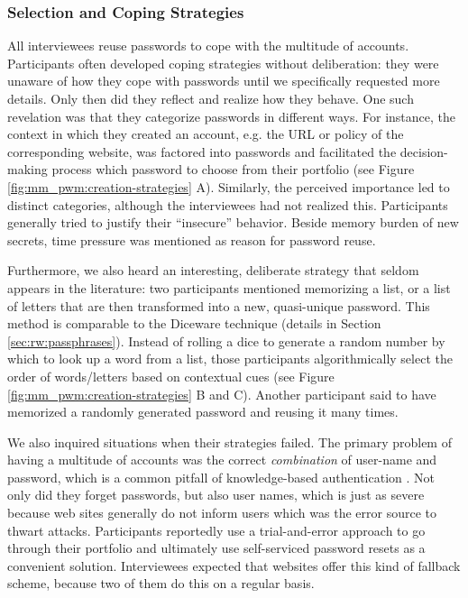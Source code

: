 \subsubsection{Selection and Coping Strategies}
All interviewees reuse passwords to cope with the multitude of accounts. Participants often developed coping strategies without deliberation: they were unaware of how they cope with passwords until we specifically requested more details. Only then did they reflect and realize how they behave. One such revelation was that they categorize passwords in different ways. For instance, the context in which they created an account, e.g. the URL or policy of the corresponding website, was factored into passwords and facilitated the decision-making process which password to choose from their portfolio (see Figure \ref{fig:mm_pwm:creation-strategies} A). Similarly, the perceived importance led to distinct categories, although the interviewees had not realized this. Participants generally tried to justify their ``insecure'' behavior. Beside memory burden of new secrets, time pressure was mentioned as reason for password reuse. 

Furthermore, we also heard an interesting, deliberate strategy that seldom appears in the literature: two participants mentioned memorizing a list, or a list of letters that are then transformed into a new, quasi-unique password. This method is comparable to the Diceware technique (details in Section \ref{sec:rw:passphrases}). Instead of rolling a dice to generate a random number by which to look up a word from a list, those participants algorithmically select the order of words/letters based on contextual cues (see Figure \ref{fig:mm_pwm:creation-strategies} B and C). Another participant said to have memorized a randomly generated password and reusing it many times. 

We also inquired situations when their strategies failed. The primary problem of having a multitude of accounts was the correct \textit{combination} of user-name and password, which is a common pitfall of knowledge-based authentication \cite{Stobert2014PasswordLifeCycle}. Not only did they forget passwords, but also user names, which is just as severe because web sites generally do not inform users which was the error source to thwart attacks. Participants reportedly use a trial-and-error approach to go through their portfolio and ultimately use self-serviced password resets as a convenient solution. Interviewees expected that websites offer this kind of fallback scheme, because two of them do this on a regular basis. 

